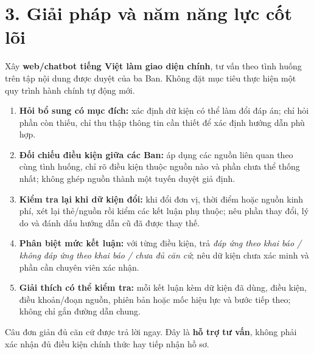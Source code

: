\documentclass[12pt,a4paper]{article}
\begin{document}
\section*{3. Giải pháp và năm năng lực cốt lõi}
Xây \textbf{web/chatbot tiếng Việt làm giao diện chính}, tư vấn theo tình huống trên tập nội dung được duyệt của ba Ban. Không đặt mục tiêu thực hiện một quy trình hành chính tự động mới.
\begin{enumerate}
\item \textbf{Hỏi bổ sung có mục đích:} xác định dữ kiện có thể làm đổi đáp án; chỉ hỏi phần còn thiếu, chỉ thu thập thông tin cần thiết để xác định hướng dẫn phù hợp.
\item \textbf{Đối chiếu điều kiện giữa các Ban:} áp dụng các nguồn liên quan theo cùng tình huống, chỉ rõ điều kiện thuộc nguồn nào và phần chưa thể thống nhất; không ghép nguồn thành một tuyến duyệt giả định.
\item \textbf{Kiểm tra lại khi dữ kiện đổi:} khi đổi đơn vị, thời điểm hoặc nguồn kinh phí, xét lại thẻ/nguồn rồi kiểm các kết luận phụ thuộc; nêu phần thay đổi, lý do và đánh dấu hướng dẫn cũ đã được thay thế.
\item \textbf{Phân biệt mức kết luận:} với từng điều kiện, trả \emph{đáp ứng theo khai báo / không đáp ứng theo khai báo / chưa đủ căn cứ}; nêu dữ kiện chưa xác minh và phần cần chuyên viên xác nhận.
\item \textbf{Giải thích có thể kiểm tra:} mỗi kết luận kèm dữ kiện đã dùng, điều kiện, điều khoản/đoạn nguồn, phiên bản hoặc mốc hiệu lực và bước tiếp theo; không chỉ gắn đường dẫn chung.
\end{enumerate}
Câu đơn giản đủ căn cứ được trả lời ngay. Đây là \textbf{hỗ trợ tư vấn}, không phải xác nhận đủ điều kiện chính thức hay tiếp nhận hồ sơ.

\newpage
\end{document}
